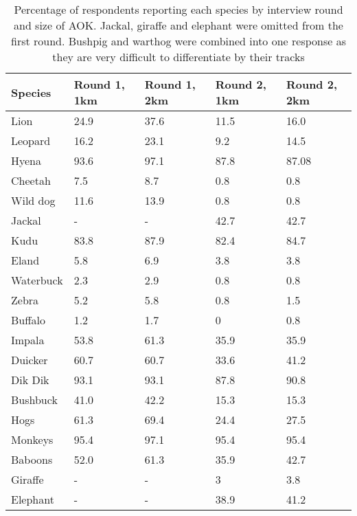 \begin{table}[h]
	\small
	\begin{center}
		\begin{tabular}{l l l l l}
			\hline \hline		
			Species	& Round 1, 1km 	& Round 1, 2km 	& Round 2, 1km 	& Round 2, 2km \\ \hline
			Lion		& 24.9			&	37.6			&	11.5			& 16.0\\	
			Leopard	& 16.2			&	23.1			&	9.2			& 14.5\\
			Hyena	& 93.6			&	97.1			&	87.8			& 87.08\\
			Cheetah	& 7.5			&	8.7			&	0.8			& 0.8\\
			Wild dog	& 11.6			&	13.9			&	0.8			& 0.8\\	
			Jackal\textdagger	& -				&	-			&	42.7			& 42.7\\	
			Kudu		&83.8			&	87.9			&	82.4			& 84.7\\	
			Eland	&5.8				&	6.9			&	3.8			& 3.8\\	
			Waterbuck&2.3			&	2.9			&	0.8			& 0.8\\	
			Zebra	&5.2				&	5.8			&	0.8			& 1.5\\	
			Buffalo	&1.2				&	1.7			&	0			& 0.8\\	
			Impala	&53.8			&	61.3			&35.9			& 35.9\\	
			Duicker	&60.7			&	60.7			&33.6			& 41.2\\	
			Dik Dik	&93.1			&	93.1			&87.8			& 90.8\\	
			Bushbuck	&41.0			&	42.2			&15.3			& 15.3\\	
			Hogs	\textdaggerdbl	&61.3			&	69.4			&24.4			& 27.5\\	
			Monkeys	&95.4			&	97.1			&95.4			& 95.4\\
			Baboons	&52.0			&	61.3			&35.9			& 42.7\\	
			Giraffe\textdagger	&-				&	-			&	3			& 3.8\\	
			Elephant\textdagger&-				& 	-			&38.9			& 41.2\\					
			\hline \hline						
		\end{tabular}
		\caption{Percentage of respondents reporting each species by interview round and size of AOK. \textdagger Jackal, giraffe and elephant were omitted from the first round. \textdaggerdbl Bushpig and warthog were combined into one response as they are very difficult to differentiate by their tracks}
	\label{table:species_detections}
	\end{center}
\end{table}

